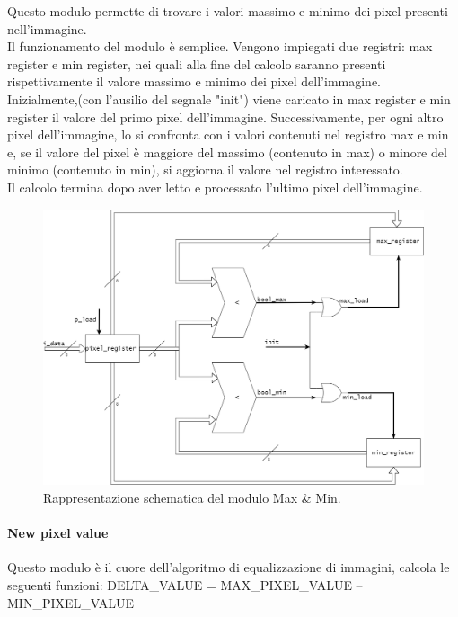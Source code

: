 Questo modulo permette di trovare i valori massimo e minimo dei pixel presenti nell'immagine.\\
Il funzionamento del modulo è semplice. Vengono impiegati due registri: max register e min register, nei quali alla fine del calcolo saranno presenti rispettivamente il valore massimo e minimo dei pixel dell'immagine.\\
Inizialmente,(con l'ausilio del segnale "init") viene caricato in max register e min register il valore del primo pixel dell'immagine. Successivamente, per ogni altro pixel dell'immagine, lo si confronta con i valori contenuti nel registro max e min e, se il valore del pixel è maggiore del massimo (contenuto in max) o minore del minimo (contenuto in min), si aggiorna il valore nel registro interessato.\\
Il calcolo termina dopo aver letto e processato l'ultimo pixel dell'immagine.

\begin{figure}[h!] %
  \includegraphics[width=\linewidth]{max_min_module}
  \caption{Rappresentazione schematica del modulo Max \& Min.}
  \label{fig:maxMin}
\end{figure}

\paragraph{New pixel value\\}
Questo modulo è il cuore dell'algoritmo di equalizzazione di immagini, calcola le seguenti funzioni:
\doublespacing
\singlespacing
DELTA\_VALUE = MAX\_PIXEL\_VALUE – MIN\_PIXEL\_VALUE

